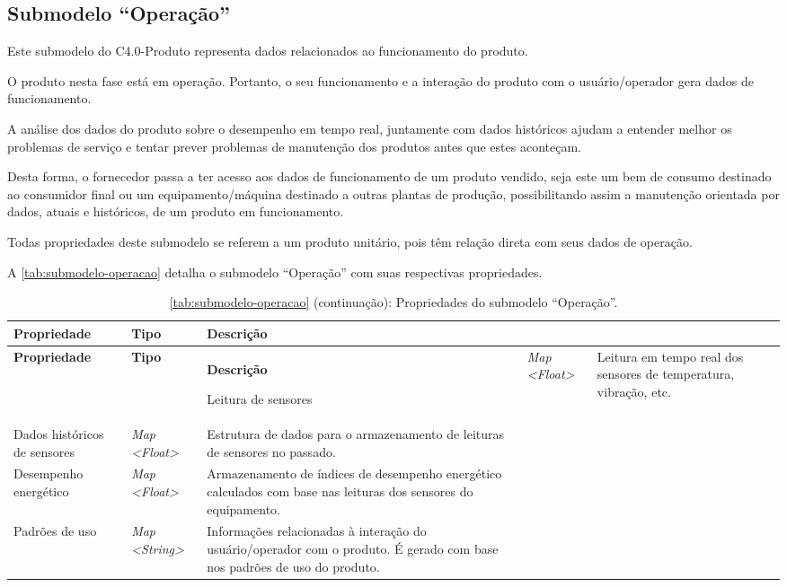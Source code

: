 \subsection{Submodelo ``Operação''}

Este submodelo do C4.0-Produto representa dados relacionados ao funcionamento do produto.

O produto nesta fase está em operação. Portanto, o seu funcionamento e a interação do produto com o usuário/operador gera dados de funcionamento.

A análise dos dados do produto sobre o desempenho em tempo real, juntamente com dados históricos ajudam a entender melhor os problemas de serviço e tentar prever problemas de manutenção dos produtos antes que estes aconteçam.

Desta forma, o fornecedor passa a ter acesso aos dados de funcionamento de um produto vendido, seja este um bem de consumo destinado ao consumidor final ou um equipamento/máquina destinado a outras plantas de produção, possibilitando assim a manutenção orientada por dados, atuais e históricos, de um produto em funcionamento.

Todas propriedades deste submodelo se referem a um produto unitário, pois têm relação direta com seus dados de operação.

A \autoref{tab:submodelo-operacao} detalha o submodelo ``Operação'' com suas respectivas propriedades.

\begin{longtable}{|p{}|p{}|p{}|}

	\caption{\label{tab:submodelo-operacao} Propriedades do submodelo ``Operação''.}
	\\ \hline \textbf{Propriedade} & \textbf{Tipo} & \textbf{Descrição}
	\endfirsthead

	\caption*{\autoref{tab:submodelo-operacao} (continuação): Propriedades do submodelo ``Operação''.}
	\\ \hline \textbf{Propriedade} & \textbf{Tipo}        & \textbf{Descrição}
	\endhead

	\hline Leitura de sensores & \textit{Map <Float>} & Leitura em tempo real dos sensores de temperatura, vibração, etc.

	\\ \hline Dados históricos de sensores & \textit{Map <Float>} & Estrutura de dados para o armazenamento de leituras de sensores no passado.

	\\ \hline Desempenho energético & \textit{Map <Float>} & Armazenamento de índices de desempenho energético calculados com base nas leituras dos sensores do equipamento.

	\\ \hline Padrões de uso & \textit{Map <String>} & Informações relacionadas à interação do usuário/operador com o produto. É gerado com base nos padrões de uso do produto.

	\\ \hline
\end{longtable}

